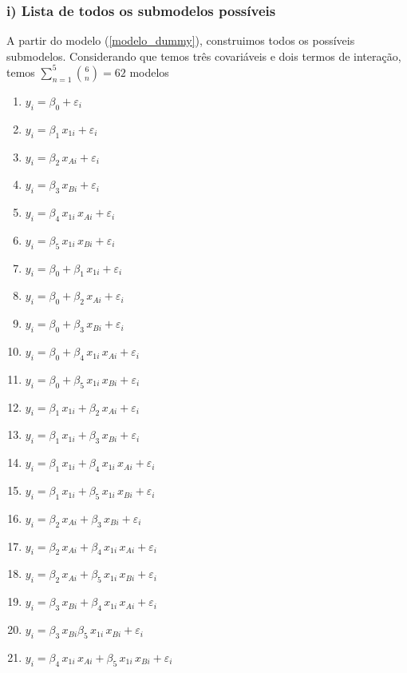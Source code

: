 \documentclass[
  letterpaper,
  DIV=11,
  numbers=noendperiod]{scrartcl}
\begin{document}
\hypertarget{i-lista-de-todos-os-submodelos-possuxedveis}{%
\subsubsection{i) Lista de todos os submodelos
possíveis}\label{i-lista-de-todos-os-submodelos-possuxedveis}}

A partir do modelo (\ref{modelo_dummy}), construimos todos os possíveis
submodelos. Considerando que temos três covariáveis e dois termos de
interação, temos \(\sum\limits_{n = 1}^5\binom{6}{n} = 62\) modelos

\begin{enumerate}
  \item $y_i = \beta_0 + \varepsilon_i$
  \item $y_i = \beta_1 \, x_{1i} + \varepsilon_i$
  \item $y_i = \beta_2 \, x_{Ai} + \varepsilon_i$
  \item $y_i = \beta_3 \, x_{Bi} + \varepsilon_i$
  \item $y_i = \beta_4 \, x_{1i} \, x_{Ai} + \varepsilon_i$
  \item $y_i = \beta_5 \, x_{1i} \, x_{Bi} + \varepsilon_i$
  
 
  \item $y_i = \beta_0 + \beta_1 \, x_{1i} + \varepsilon_i$
  \item $y_i = \beta_0 + \beta_2 \, x_{Ai} + \varepsilon_i$
  \item $y_i = \beta_0 + \beta_3 \, x_{Bi} + \varepsilon_i$
  \item $y_i = \beta_0 + \beta_4 \, x_{1i} \, x_{Ai} + \varepsilon_i$
  \item $y_i = \beta_0 + \beta_5 \, x_{1i} \, x_{Bi} + \varepsilon_i$
  \item $y_i = \beta_1 \, x_{1i} + \beta_2 \, x_{Ai} + \varepsilon_i$
  \item $y_i = \beta_1 \, x_{1i} + \beta_3 \, x_{Bi} + \varepsilon_i$
  \item $y_i = \beta_1 \, x_{1i} + \beta_4 \, x_{1i} \, x_{Ai} + \varepsilon_i$
  \item $y_i =  \beta_1 \, x_{1i} + \beta_5 \, x_{1i} \, x_{Bi} + \varepsilon_i$
  \item $y_i = \beta_2 \, x_{Ai} + \beta_3 \, x_{Bi}+ \varepsilon_i$
  \item $y_i = \beta_2 \, x_{Ai} + \beta_4 \, x_{1i} \, x_{Ai} + \varepsilon_i$
  \item $y_i = \beta_2 \, x_{Ai} + \beta_5 \, x_{1i} \, x_{Bi} + \varepsilon_i$
  \item $y_i = \beta_3 \, x_{Bi} + \beta_4 \, x_{1i} \, x_{Ai} + \varepsilon_i$
  \item $y_i = \beta_3 \, x_{Bi} \beta_5 \, x_{1i} \, x_{Bi} + \varepsilon_i$
  \item $y_i = \beta_4 \, x_{1i} \, x_{Ai} + \beta_5 \, x_{1i} \, x_{Bi} + \varepsilon_i$
  

\end{enumerate}
\end{document}
